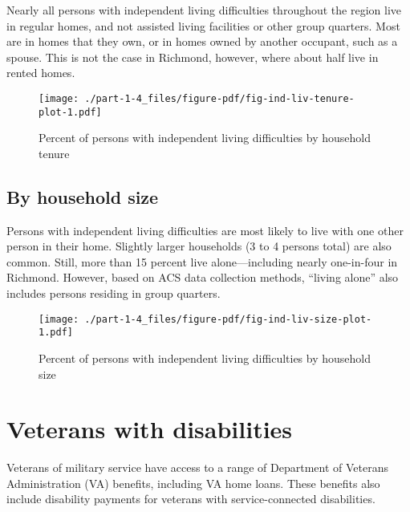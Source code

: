 \documentclass[
  letterpaper,
  DIV=11,
  numbers=noendperiod]{scrreprt}
\begin{document}
Nearly all persons with independent living difficulties throughout the
region live in regular homes, and not assisted living facilities or
other group quarters. Most are in homes that they own, or in homes owned
by another occupant, such as a spouse. This is not the case in Richmond,
however, where about half live in rented homes.

\begin{figure}

{\centering \texttt{[image: ./part-1-4\_files/figure-pdf/fig-ind-liv-tenure-plot-1.pdf]}

}

\caption{\label{fig-ind-liv-tenure-plot}Percent of persons with
independent living difficulties by household tenure}

\end{figure}

\hypertarget{by-household-size}{%
\subsection{By household size}\label{by-household-size}}

Persons with independent living difficulties are most likely to live
with one other person in their home. Slightly larger households (3 to 4
persons total) are also common. Still, more than 15 percent live
alone---including nearly one-in-four in Richmond. However, based on ACS
data collection methods, ``living alone'' also includes persons residing
in group quarters.

\begin{figure}

{\centering \texttt{[image: ./part-1-4\_files/figure-pdf/fig-ind-liv-size-plot-1.pdf]}

}

\caption{\label{fig-ind-liv-size-plot}Percent of persons with
independent living difficulties by household size}

\end{figure}

\hypertarget{veterans-with-disabilities}{%
\section{Veterans with disabilities}\label{veterans-with-disabilities}}

Veterans of military service have access to a range of Department of
Veterans Administration (VA) benefits, including VA home loans. These
benefits also include disability payments for veterans with
service-connected disabilities.
\end{document}
